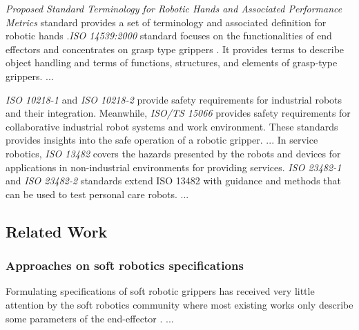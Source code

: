 \documentclass[lettersize,journal]{IEEEtran}
\begin{document}
\emph{Proposed Standard Terminology for Robotic Hands and Associated Performance Metrics} standard provides a set of terminology and associated definition for robotic hands \cite{Falco2018}.\emph{ISO 14539:2000} standard focuses on the functionalities of end effectors and concentrates on grasp type grippers \cite{ISO14539:2000}. It provides terms to describe object handling and terms of functions, structures, and elements of grasp-type grippers. ...


\emph{ISO 10218-1} and \emph{ISO 10218-2} provide safety requirements for industrial robots and their integration.
Meanwhile, \emph{ISO/TS 15066} provides safety requirements for collaborative industrial robot systems and work environment. 
These standards provides insights into the safe operation of a robotic gripper. ...
In service robotics, \emph{ISO 13482 }covers the hazards presented by the robots and devices for applications in non-industrial environments for providing services. \emph{ISO 23482-1} and \emph{ISO 23482-2} standards extend ISO 13482 with guidance and methods that can be used to test personal care robots. ...



\subsection{Related Work}\label{relatedwork}

\subsubsection{Approaches on soft robotics specifications} 
Formulating specifications of soft robotic grippers has received very little attention by the soft robotics community where most existing works only describe some parameters of the end-effector \cite{Hong2022,Bhattacharya2019,Tadakuma2020,Loh2014,Nishikawa2019,Mohan2020}.  ...
\end{document}
